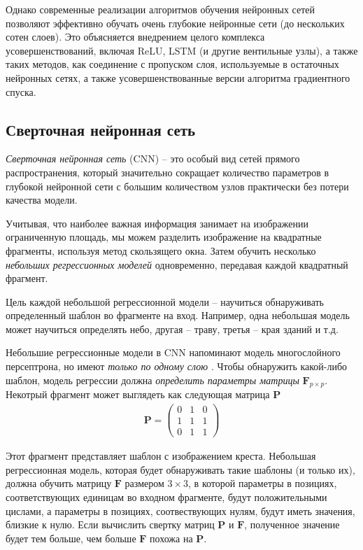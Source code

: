 \documentclass[%
	11pt,
	a4paper,
	utf8,
		]{article}
\begin{document}
Однако современные реализации алгоритмов обучения нейронных сетей позволяют эффективно обучать очень глубокие нейронные сети (до нескольких сотен слоев). Это объясняется внедрением целого комплекса усовершенствований, включая ReLU, LSTM (и другие вентильные узлы), а также таких методов, как соединение с пропуском слоя, используемые в остаточных нейронных сетях, а также усовершенствованные версии алгоритма градиентного спуска.


\subsection{Сверточная нейронная сеть}

\emph{Сверточная нейронная сеть} (CNN) -- это особый вид сетей прямого распространения, который значительно сокращает количество параметров в глубокой нейронной сети с большим количеством узлов практически без потери качества модели.

Учитывая, что наиболее важная информация занимает на изображении ограниченную площадь, мы можем разделить изображение на квадратные фрагменты, используя метод скользящего окна. Затем обучить несколько \emph{небольших регрессионных моделей} одновременно, передавая каждой квадратный фрагмент.

Цель каждой небольшой регрессионной модели -- научиться обнаруживать определенный шаблон во фрагменте на вход. Например, одна небольшая модель может научиться определять небо, другая -- траву, третья -- края зданий и т.д.

Небольшие регрессионные модели в CNN напоминают модель многослойного персептрона, но имеют \emph{только по одному слою} \cite[]{burkov:2020}. Чтобы обнаружить какой-либо шаблон, модель регрессии должна \emph{определить параметры матрицы} $ \mathbf{F}_{p \times p} $. Некотрый фрагмент может выглядеть как следующая матрица $ \mathbf{P} $
\begin{align*}
	\mathbf{P} =
	\begin{pmatrix}
		0 & 1 & 0 \\
		1 & 1 & 1 \\
		0 & 1 & 1
	\end{pmatrix}
\end{align*}

Этот фрагмент представляет шаблон с изображением креста. Небольшая регрессионная модель, которая будет обнаруживать такие шаблоны (и только их), должна обучить матрицу $ \mathbf{F} $ размером $ 3 \times 3 $, в которой параметры в позициях, соответствующих единицам во входном фрагменте, будут положительными цислами, а параметры в позициях, соотвествующих нулям, будут иметь значения, близкие к нулю. Если вычислить свертку матриц $ \mathbf{P} $ и $ \mathbf{F} $, полученное значение будет тем больше, чем больше $ \mathbf{F} $ похожа на $ \mathbf{P} $.
\end{document}
